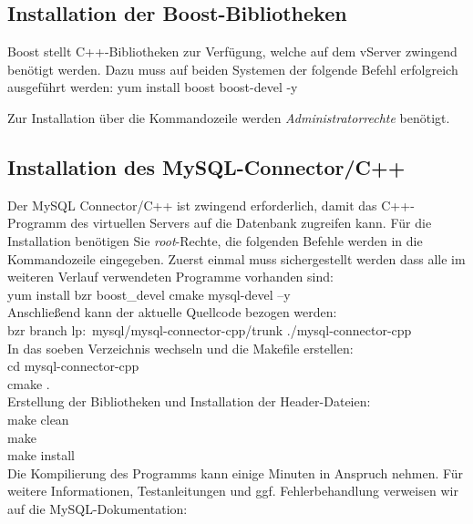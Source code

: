 \documentclass[fontsize = 12pt, paper = a4]{scrreprt}
\begin{document}
\subsection{Installation der Boost-Bibliotheken}

Boost stellt C++-Bibliotheken zur Verfügung, welche auf dem vServer zwingend benötigt werden.
Dazu muss auf beiden Systemen der folgende Befehl erfolgreich ausgeführt werden:
    yum install boost boost-devel -y
    
Zur Installation über die Kommandozeile werden \textit{Administratorrechte} benötigt.

\subsection{Installation des MySQL-Connector/C++}

Der MySQL Connector/C++ ist zwingend erforderlich, damit das C++-Programm des virtuellen Servers auf die Datenbank zugreifen kann. Für die Installation benötigen Sie \textit{root}-Rechte, die folgenden Befehle werden in die Kommandozeile eingegeben.
Zuerst einmal muss sichergestellt werden dass alle im weiteren Verlauf verwendeten Programme vorhanden sind:\\
  yum install bzr boost\_devel cmake mysql-devel –y \\

Anschließend kann der aktuelle Quellcode bezogen werden:\\
  bzr branch lp:~mysql/mysql-connector-cpp/trunk ./mysql-connector-cpp \\

In das soeben Verzeichnis wechseln und die Makefile erstellen:\\
  cd mysql-connector-cpp \\
  cmake . \\

Erstellung der Bibliotheken und Installation der Header-Dateien: \\
  make clean \\
  make \\
  make install \\

Die Kompilierung des Programms kann einige Minuten in Anspruch nehmen. Für weitere Informationen, Testanleitungen und ggf. Fehlerbehandlung verweisen wir auf die MySQL-Dokumentation:
\end{document}
